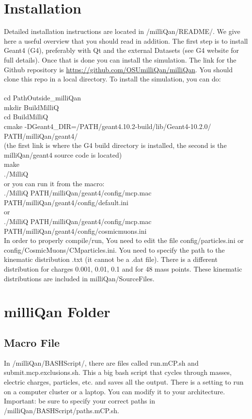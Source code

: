 \documentclass[prd,noshowpacs,nofootinbib,amsmath,amssymb,superscriptaddress]{revtex4}
\begin{document}
\section{Installation}
Detailed installation instructions are located in /milliQan/README/. We give here a useful overview that you should read in addition. The first step is to install Geant4 (G4), preferably with Qt and the external Datasets (see G4 website for full details). Once that is done you can install the simulation. The link for the Github repository is \url{https://github.com/OSUmilliQan/milliQan}. You should clone this repo in a local directory. To install the simulation, you can do:\\ \\
%
cd PathOutside\_milliQan \\
mkdir BuildMilliQ \\
cd BuildMilliQ \\
cmake -DGeant4\_DIR=/PATH/geant4.10.2-build/lib/Geant4-10.2.0/ PATH/milliQan/geant4/ \\
(the first link is where the G4 build directory is installed, the second is the milliQan/geant4 source code is located)\\
make \\
./MilliQ \\
or you can run it from the macro:\\
./MilliQ PATH/milliQan/geant4/config/mcp.mac PATH/milliQan/geant4/config/default.ini\\ 
or\\
./MilliQ PATH/milliQan/geant4/config/mcp.mac PATH/milliQan/geant4/config/cosmicmuons.ini\\ 
% 
In order to properly compile/run, You need to edit the file config/particles.ini or config/CosmicMuons/CMparticles.ini. You need to specify the path to the kinematic distribution .txt (it cannot be a .dat file). 
There is a different distribution for charges 0.001, 0.01, 0.1 and for 48 mass points. These kinematic distributions are included in milliQan/SourceFiles.

\section{milliQan Folder}
\subsection{Macro File} 
In /milliQan/BASHScript/, there are files called run.mCP.sh and submit.mcp.exclusions.sh. 
This a big bash script that cycles through masses, electric charges, particles, etc. and saves all the output. 
There is a setting to run on a computer cluster or a laptop. You can modify it to your architecture. \\
Important: be sure to specify your correct paths in /milliQan/BASHScript/paths.mCP.sh.\\
\end{document}
